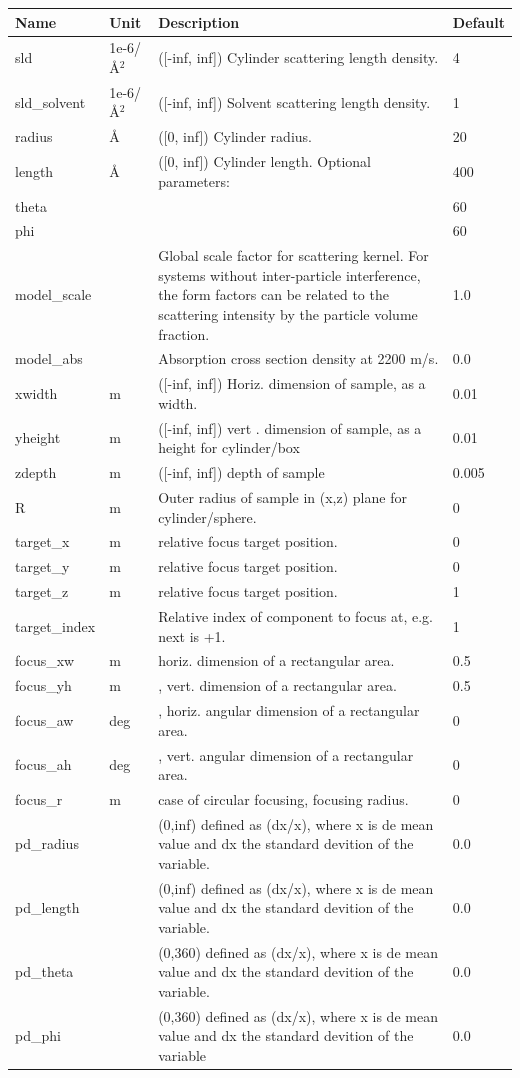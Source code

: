 \begin{longtable}{p{}p{}p{}p{}}
\toprule
\textbf{Name} & \textbf{Unit} & \textbf{Description} & \textbf{Default} \\
\midrule
\endhead
sld & 1e-6/\AA{}$^{2}$ & ([-inf, inf]) Cylinder scattering length density. & 4 \\
sld\_solvent & 1e-6/\AA{}$^{2}$ & ([-inf, inf]) Solvent scattering length density. & 1 \\
radius & \AA{} & ([0, inf]) Cylinder radius. & 20 \\
length & \AA{} & ([0, inf]) Cylinder length. Optional parameters: & 400 \\
theta &  &  & 60 \\
phi &  &  & 60 \\
model\_scale &   & Global scale factor for scattering kernel. For systems without inter-particle interference, the form factors can be related to the scattering intensity by the particle volume fraction. & 1.0 \\
model\_abs &   & Absorption cross section density at 2200 m/s. & 0.0 \\
xwidth & m & ([-inf, inf]) Horiz. dimension of sample, as a width. & 0.01 \\
yheight & m & ([-inf, inf]) vert . dimension of sample, as a height for cylinder/box & 0.01 \\
zdepth & m & ([-inf, inf]) depth of sample & 0.005 \\
R & m & Outer radius of sample in (x,z) plane for cylinder/sphere. & 0 \\
target\_x & m & relative focus target position. & 0 \\
target\_y & m & relative focus target position. & 0 \\
target\_z & m & relative focus target position. & 1 \\
target\_index &   & Relative index of component to focus at, e.g. next is +1. & 1 \\
focus\_xw & m & horiz. dimension of a rectangular area. & 0.5 \\
focus\_yh & m & , vert. dimension of a rectangular area. & 0.5 \\
focus\_aw & deg & , horiz. angular dimension of a rectangular area. & 0 \\
focus\_ah & deg & , vert. angular dimension of a rectangular area. & 0 \\
focus\_r & m & case of circular focusing, focusing radius. & 0 \\
pd\_radius &  & (0,inf) defined as (dx/x), where x is de mean value and dx the standard devition of the variable. & 0.0 \\
pd\_length &  & (0,inf) defined as (dx/x), where x is de mean value and dx the standard devition of the variable. & 0.0 \\
pd\_theta &  & (0,360) defined as (dx/x), where x is de mean value and dx the standard devition of the variable. & 0.0 \\
pd\_phi &  & (0,360) defined as (dx/x), where x is de mean value and dx the standard devition of the variable & 0.0 \\
\bottomrule
\end{longtable}

